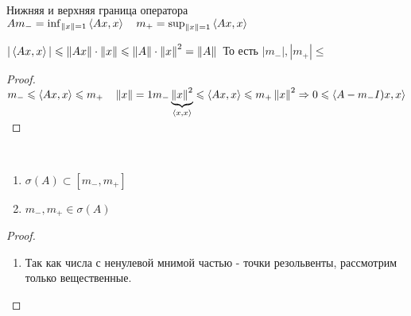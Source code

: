 \begin{definition}
    Нижняя и верхняя граница оператора $A \\
    m_- = \inf_{\left\|x\right\| = 1} \left\langle Ax , x\right\rangle \quad
    m_+ = \sup_{\left\|x\right\| = 1} \left\langle Ax , x\right\rangle$
\end{definition}

\begin{statement}
    $|\left\langle Ax , x\right\rangle| \leqslant \left\|Ax\right\| \cdot \left\|x\right\| \leqslant
    \left\|A\right\| \cdot \left\|x\right\|^2 = \left\|A\right\| \\$
    То есть $|m_-|, |m_+| \leqslant$
\end{statement}
\begin{proof}\
    $m_- \leqslant \left\langle Ax , x\right\rangle \leqslant m_+ \quad \left\|x\right\| = 1 \\
    m_- \underbrace{\left\|x\right\|^2}_{\left\langle x , x\right\rangle}
    \leqslant \left\langle Ax , x\right\rangle \leqslant m_+ \left\|x\right\|^2 \Rightarrow
    0 \leqslant \left\langle A - m_- I)x , x\right\rangle$
\end{proof}

\begin{theorem}\
    \begin{enumerate}
    	\item $\sigma(A) \subset [m_-, m_+]$
    	\item $m_-, m_+ \in \sigma(A)$
    \end{enumerate}
\end{theorem}
\begin{proof}\
    \begin{enumerate}
    	\item
    	    Так как числа с ненулевой мнимой частью - точки резольвенты,
    	    рассмотрим только вещественные.
    \end{enumerate}
\end{proof}

